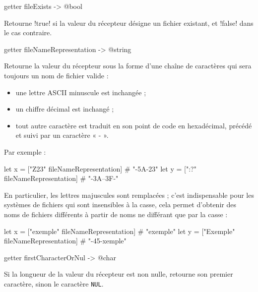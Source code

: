 \begin{galgasbox}
getter fileExists -> @bool
\end{galgasbox}

Retourne \ggs!true! si la valeur du récepteur désigne un fichier existant, et \ggs!false! dans le cas contraire.







\begin{galgasbox}
getter fileNameRepresentation -> @string
\end{galgasbox}

Retourne la valeur du récepteur sous la forme d'une chaîne de caractères qui sera toujours un nom de fichier valide :
\begin{itemize}
\item une lettre ASCII minuscule est inchangée ;
\item un chiffre décimal est inchangé ;
\item tout autre caractère est traduit en son point de code en hexadécimal, précédé et suivi par un caractère « - ».
\end{itemize}

Par exemple :
\begin{galgas}
let x = ["Z23" fileNameRepresentation] # "-5A-23"
let y = [":?" fileNameRepresentation] # "-3A--3F-"
\end{galgas}

En particulier, les lettres majuscules sont remplacées ; c'est indispensable pour les systèmes de fichiers qui sont insensibles à la casse, cela permet d'obtenir des noms de fichiers différents à partir de noms ne différant que par la casse :

\begin{galgas}
let x = ["exemple" fileNameRepresentation] # "exemple"
let y = ["Exemple" fileNameRepresentation] # "-45-xemple"
\end{galgas}







\begin{galgasbox}
getter firstCharacterOrNul -> @char
\end{galgasbox}

Si la longueur de la valeur du récepteur est non nulle, retourne son premier caractère, sinon le caractère \texttt{NUL}.







